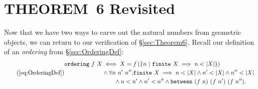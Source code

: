 





\section{THEOREM~6 Revisited}
Now that we have two ways to carve out the natural numbers from geometric objects, we can return to our verification of \S\ref{sec:Theorem6}. Recall our definition of an \emph{ordering} from \S\ref{sec:OrderingDef}:
\begin{equation}
  \tag{\ref{eq:OrderingDef}}
  \begin{split}
    \code{ordering}\ f\ X &\iff X = f\left(\left\{n\ \vert\ \code{finite}\ X \implies n < \left|X\right|\right\}\right)\\
    &\wedge \forall n\ n'\ n''. \code{finite}\ X \implies n < \left|X\right| \wedge n' < \left|X\right| \wedge n'' < \left|X\right|\\
    &\qquad\wedge n < n' \wedge n' < n'' \wedge \between{(f\ n)}{(f\ n')}{(f\ n'')}.
    \end{split}
\end{equation}

